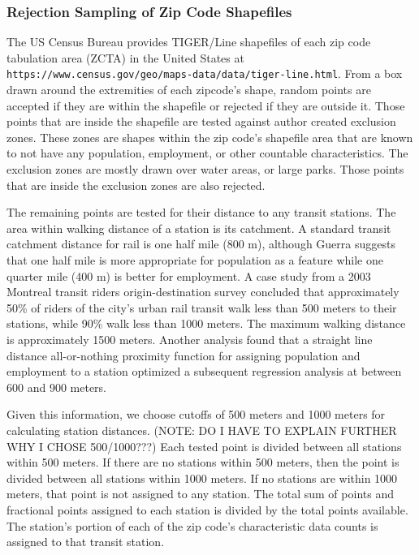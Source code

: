 \documentclass{article}
\begin{document}
\subsubsection{Rejection Sampling of Zip Code Shapefiles}

The US Census Bureau provides TIGER/Line shapefiles of each zip code tabulation area (ZCTA) in the United States at \linebreak\texttt{https://www.census.gov/geo/maps-data/data/tiger-line.html}.  From a box drawn around the extremities of each zipcode's shape, random points are accepted if they are within the shapefile or rejected if they are outside it. Those points that are inside the shapefile are tested against author created exclusion zones. These zones are shapes within the zip code's shapefile area that are known to not have any population, employment, or other countable characteristics. The exclusion zones are mostly drawn over water areas, or large parks. Those points that are inside the exclusion zones are also rejected.

The remaining points are tested for their distance to any transit stations. The area within walking distance of a station is its catchment. A standard transit catchment distance for rail is one half mile (800 m), although Guerra\cite{Guerra2012} suggests that one half mile is more appropriate for population as a feature while one quarter mile (400 m) is better for employment. A case study\cite{ElGeneidy2014} from a 2003 Montreal transit riders origin-destination survey concluded that approximately 50\% of riders of the city's urban rail transit walk less than 500 meters to their stations, while 90\% walk less than 1000 meters. The maximum walking distance is approximately 1500 meters. Another analysis\cite{Gutierrez2011} found that a straight line distance all-or-nothing proximity function for assigning population and employment to a station optimized a subsequent regression analysis at between 600 and 900 meters. 

Given this information, we choose cutoffs of 500 meters and 1000 meters for calculating station distances. (NOTE: DO I HAVE TO EXPLAIN FURTHER WHY I CHOSE 500/1000???) Each tested point is divided between all stations within 500 meters. If there are no stations within 500 meters, then the point is divided between all stations within 1000 meters. If no stations are within 1000 meters, that point is not assigned to any station. The total sum of points and fractional points assigned to each station is divided by the total points available. The station's portion of each of the zip code's characteristic data counts is assigned to that transit station. 
\end{document}
